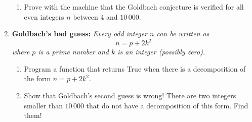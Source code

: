\documentclass[11pt,class=report,crop=false]{standalone}
\begin{document}
\begin{activite}
\begin{enumerate}
\begin{enumerate}
   \item Prove with the machine that the Goldbach conjecture is verified for all even integers $n$ between $4$ and $10\,000$.
    
  \end{enumerate}
  
  \item \textbf{Goldbach's bad guess: } \emph{Every odd integer $n$ can be written as
  $$n = p + 2k^2$$
where $p$ is a prime number and $k$ is an integer (possibly zero).}
  
  \begin{enumerate}
    \item Program a function  that returns \og{}True\fg{} when there is a decomposition of the form $n=p+2k^2$.
    
    \item Show that Goldbach's second guess is wrong! There are two integers smaller than $10\,000$ that do not have a decomposition of this form. Find them!
  \end{enumerate} 
\end{enumerate}   
     
\end{activite}



\end{document}
